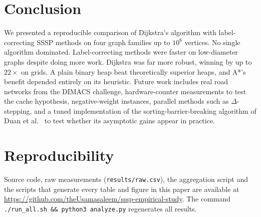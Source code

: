 \documentclass[conference]{IEEEtran}
\begin{document}
\section{Conclusion}

We presented a reproducible comparison of Dijkstra's algorithm with
label-correcting SSSP methods on four graph families up to $10^6$ vertices. No
single algorithm dominated. Label-correcting methods were faster on
low-diameter graphs despite doing more work. Dijkstra was far more robust,
winning by up to $22\times$ on grids. A plain binary heap beat theoretically
superior heaps, and A*'s benefit depended entirely on its heuristic. Future
work includes real road networks from the DIMACS challenge, hardware-counter
measurements to test the cache hypothesis, negative-weight instances, parallel
methods such as $\Delta$-stepping, and a tuned implementation of the
sorting-barrier-breaking algorithm of Duan et al.~\cite{duan2025} to test
whether its asymptotic gains appear in practice.

\section*{Reproducibility}
\label{sec:repro}
Source code, raw measurements (\texttt{results/raw.csv}), the aggregation script
and the scripts that generate every table and figure in this paper are available
at \url{https://github.com/theUsamasaleem/sssp-empirical-study}. The
command \texttt{./run\_all.sh \&\& python3 analyze.py} regenerates all results.



\end{document}
